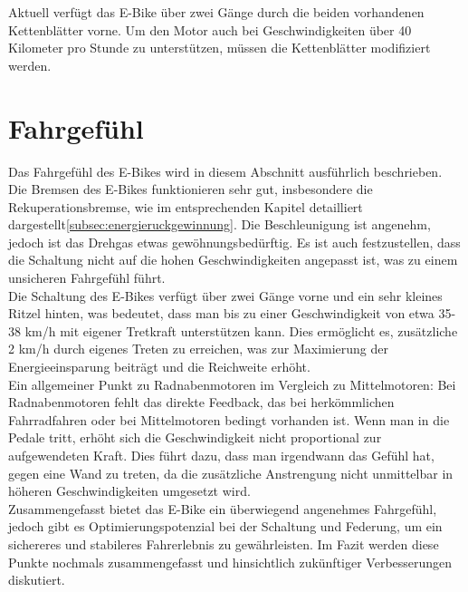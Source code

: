 Aktuell verfügt das E-Bike über zwei Gänge durch die beiden vorhandenen Kettenblätter vorne.
Um den Motor auch bei Geschwindigkeiten über 40 Kilometer pro Stunde zu unterstützen, müssen die Kettenblätter modifiziert werden.

\section{Fahrgefühl}


Das Fahrgefühl des E-Bikes wird in diesem Abschnitt ausführlich beschrieben.
Die Bremsen des E-Bikes funktionieren sehr gut, insbesondere die Rekuperationsbremse, wie im entsprechenden Kapitel detailliert dargestellt\ref{subsec:energieruckgewinnung}.
Die Beschleunigung ist angenehm, jedoch ist das Drehgas etwas gewöhnungsbedürftig.
Es ist auch festzustellen, dass die Schaltung nicht auf die hohen Geschwindigkeiten angepasst ist, was zu einem unsicheren Fahrgefühl führt.\\

Die Schaltung des E-Bikes verfügt über zwei Gänge vorne und ein sehr kleines Ritzel hinten, was bedeutet, dass man bis zu einer Geschwindigkeit von etwa 35-38 km/h mit eigener Tretkraft unterstützen kann.
Dies ermöglicht es, zusätzliche 2 km/h durch eigenes Treten zu erreichen, was zur Maximierung der Energieeinsparung beiträgt und die Reichweite erhöht.\\

Ein allgemeiner Punkt zu Radnabenmotoren im Vergleich zu Mittelmotoren: Bei Radnabenmotoren fehlt das direkte Feedback, das bei herkömmlichen Fahrradfahren oder bei Mittelmotoren bedingt vorhanden ist.
Wenn man in die Pedale tritt, erhöht sich die Geschwindigkeit nicht proportional zur aufgewendeten Kraft.
Dies führt dazu, dass man irgendwann das Gefühl hat, gegen eine Wand zu treten, da die zusätzliche Anstrengung nicht unmittelbar in höheren Geschwindigkeiten umgesetzt wird.\\

Zusammengefasst bietet das E-Bike ein überwiegend angenehmes Fahrgefühl, jedoch gibt es Optimierungspotenzial bei der Schaltung und Federung, um ein sichereres und stabileres Fahrerlebnis zu gewährleisten.
Im Fazit werden diese Punkte nochmals zusammengefasst und hinsichtlich zukünftiger Verbesserungen diskutiert.





